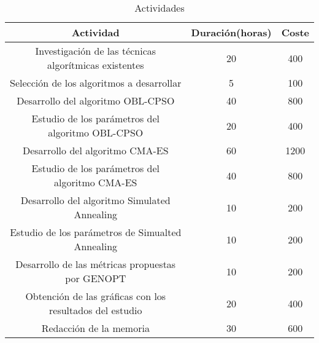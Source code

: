 \begin{table}[h]
    \begin{tabular}{|c|c|c|}
    \hline
    Actividad                                                & Duración(horas) & Coste    \\ \hline
    Investigación de las técnicas algorítmicas existentes    & 20              & 400      \\ \hline
    Selección de los algoritmos a desarrollar                & 5               & 100      \\ \hline
    Desarrollo del algoritmo OBL-CPSO                        & 40              & 800      \\ \hline
    Estudio de los parámetros del algoritmo OBL-CPSO         & 20              & 400      \\ \hline
    Desarrollo del algoritmo CMA-ES                          & 60              & 1200     \\ \hline
    Estudio de los parámetros del algoritmo CMA-ES           & 40              & 800      \\ \hline
    Desarrollo del algoritmo Simulated Annealing             & 10              & 200      \\ \hline
    Estudio de los parámetros de Simualted Annealing         & 10              & 200      \\ \hline
    Desarrollo de las métricas propuestas por GENOPT         & 10              & 200      \\ \hline
    Obtención de las gráficas con los resultados del estudio & 20              & 400      \\ \hline
    Redacción de la memoria                                  & 30              & 600      \\ \hline
    \end{tabular}
    \caption {Actividades}
\end{table}
